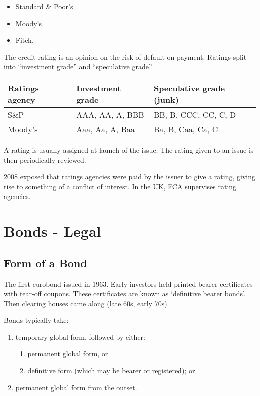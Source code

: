 \documentclass[
]{article}
\providecommand{\tightlist}{%
  \setlength{\itemsep}{0pt}\setlength{\parskip}{0pt}}
\begin{document}
\begin{itemize}
\tightlist
\item
  Standard \& Poor's
\item
  Moody's
\item
  Fitch.
\end{itemize}

The credit rating is an opinion on the risk of default on payment.
Ratings split into ``investment grade'' and ``speculative grade''.

\begin{longtable}[]{@{}lll@{}}
\toprule()
Ratings agency & Investment grade & Speculative grade (junk) \\
\midrule()
\endhead
S\&P & AAA, AA, A, BBB & BB, B, CCC, CC, C, D \\
Moody's & Aaa, Aa, A, Baa & Ba, B, Caa, Ca, C \\
\bottomrule()
\end{longtable}

A rating is usually assigned at launch of the issue. The rating given to
an issue is then periodically reviewed.

2008 exposed that ratings agencies were paid by the issuer to give a
rating, giving rise to something of a conflict of interest. In the UK,
FCA supervises rating agencies.

\hypertarget{bonds---legal}{%
\section{Bonds - Legal}\label{bonds---legal}}

\hypertarget{form-of-a-bond}{%
\subsection{Form of a Bond}\label{form-of-a-bond}}

The first eurobond issued in 1963. Early investors held printed bearer
certificates with tear-off coupons. These certificates are known as
`definitive bearer bonds'. Then clearing houses came along (late 60s,
early 70s).

Bonds typically take:

\begin{enumerate}
\def\labelenumi{\arabic{enumi}.}
\tightlist
\item
  temporary global form, followed by either:

  \begin{enumerate}
  \def\labelenumii{\arabic{enumii}.}
  \tightlist
  \item
    permanent global form, or
  \item
    definitive form (which may be bearer or registered); or
  \end{enumerate}
\item
  permanent global form from the outset.
\end{enumerate}
\end{document}
